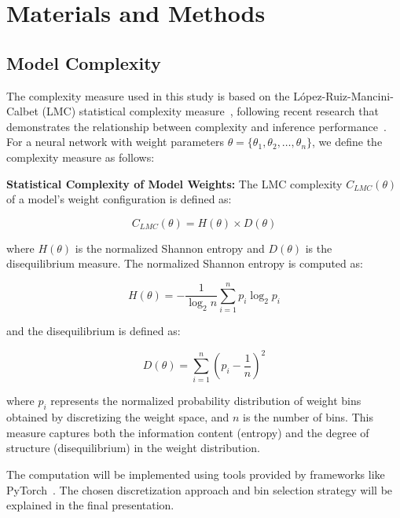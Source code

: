 \section{Materials and Methods}

    \subsection{Model Complexity}

        The complexity measure used in this study is based on the López-Ruiz-Mancini-Calbet (LMC) statistical complexity measure~\cite{lopez1995statistical, martin2003statistical}, following recent research that demonstrates the relationship between complexity and inference performance~\cite{murta2025complexity}. For a neural network with weight parameters $\theta = \{\theta_1, \theta_2, \ldots, \theta_n\}$, we define the complexity measure as follows:

        \textbf{Statistical Complexity of Model Weights:}
        The LMC complexity $C_{LMC}(\theta)$ of a model's weight configuration is defined as:

        \begin{equation}
            C_{LMC}(\theta) = H(\theta) \times D(\theta)
        \end{equation}

        where $H(\theta)$ is the normalized Shannon entropy and $D(\theta)$ is the disequilibrium measure. The normalized Shannon entropy is computed as:

        \begin{equation}
            H(\theta) = -\frac{1}{\log_2 n} \sum_{i=1}^{n} p_i \log_2 p_i
        \end{equation}

        and the disequilibrium is defined as:

        \begin{equation}
            D(\theta) = \sum_{i=1}^{n} \left(p_i - \frac{1}{n}\right)^2
        \end{equation}

        where $p_i$ represents the normalized probability distribution of weight bins obtained by discretizing the weight space, and $n$ is the number of bins. This measure captures both the information content (entropy) and the degree of structure (disequilibrium) in the weight distribution.

        The computation will be implemented using tools provided by frameworks like PyTorch~\cite{paszke2019pytorch}. The chosen discretization approach and bin selection strategy will be explained in the final presentation.

